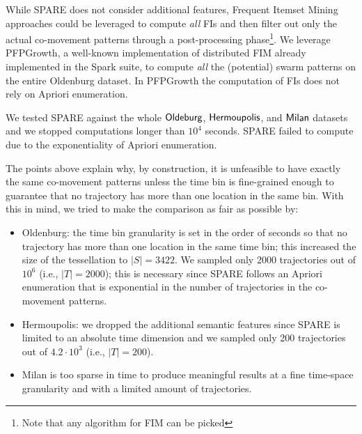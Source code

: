 \documentclass[preprint,12pt,authoryear]{elsarticle} %
\renewcommand{\sf}[1]{\textsf{\textup{#1}}}
\newcommand{\mf}[1]{#1}
\begin{document}
\mf{
While SPARE does not consider additional features, Frequent Itemset Mining approaches could be leveraged to compute \textit{all} FIs and then filter out only the actual co-movement patterns through a post-processing phase\footnote{Note that any algorithm for FIM can be picked}.
We leverage PFPGrowth, a well-known implementation of distributed FIM already implemented in the Spark suite, to compute \textit{all} the (potential) swarm patterns on the entire \sf{Oldenburg} dataset.
In PFPGrowth the computation of FIs does not rely on Apriori enumeration. 

We tested SPARE against the whole $\sf{Oldeburg}$, $\sf{Hermoupolis}$, and $\sf{Milan}$ datasets and we stopped computations longer than $10^4$ seconds.
SPARE failed to compute due to the exponentiality of Apriori enumeration.
}
The points above explain why, by construction, it is unfeasible to have exactly the same co-movement patterns unless the time bin is fine-grained enough to guarantee that no trajectory has more than one location in the same bin. With this in mind, we tried to make the comparison as fair as possible by:
\mf{
\begin{itemize}
    \item \sf{Oldenburg}: the time bin granularity is set in the order of seconds so that no trajectory has more than one location in the same time bin; this increased the size of the tessellation to $|S|=3422$. We sampled only 2000 trajectories out of $10^6$ (i.e., $|T|=2000$); this is necessary since SPARE follows an Apriori enumeration that is exponential in the number of trajectories in the co-movement patterns.
    \item \sf{Hermoupolis}: we dropped the additional semantic features since SPARE is limited to an absolute time dimension and we sampled only 200 trajectories out of $4.2 \cdot 10^3$ (i.e., $|T|=200$).
    \item \sf{Milan} is too sparse in time to produce meaningful results at a fine time-space granularity and with a limited amount of trajectories.
\end{itemize}
}
\end{document}
